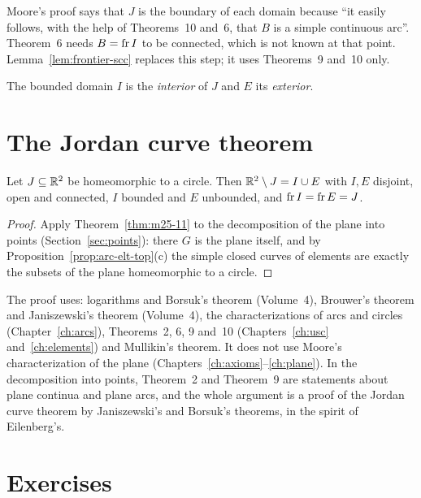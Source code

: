 
\begin{remark}
Moore's proof says that $J$ is the boundary of each domain because ``it easily follows, with the help
of Theorems~10 and~6, that $B$ is a simple continuous arc''. Theorem~6 needs $B=\operatorname{fr} I$ to be
connected, which is not known at that point. Lemma~\ref{lem:frontier-scc} replaces this step; it uses
Theorems~9 and~10 only.
\end{remark}

The bounded domain $I$ is the \emph{interior} of $J$ and $E$ its \emph{exterior}.

\section{The Jordan curve theorem}

\begin{theorem}\label{thm:jct}
Let $J\subseteq\mathbb{R}^2$ be homeomorphic to a circle. Then $\mathbb{R}^2\setminus J=I\cup E$ with $I,E$ disjoint,
open and connected, $I$ bounded and $E$ unbounded, and $\operatorname{fr} I=\operatorname{fr} E=J$.
\end{theorem}

\begin{proof}
Apply Theorem~\ref{thm:m25-11} to the decomposition of the plane into points
(Section~\ref{sec:points}): there $G$ is the plane itself, and by
Proposition~\ref{prop:arc-elt-top}(c) the simple closed curves of elements are exactly the subsets
of the plane homeomorphic to a circle.
\end{proof}


The proof uses: logarithms and Borsuk's theorem (Volume~4), Brouwer's theorem and Janiszewski's
theorem (Volume~4), the characterizations of arcs and circles (Chapter~\ref{ch:arcs}), Theorems~2,
6, 9 and~10 (Chapters~\ref{ch:usc} and~\ref{ch:elements}) and Mullikin's theorem. It does not use
Moore's characterization of the plane (Chapters~\ref{ch:axioms}--\ref{ch:plane}). In the decomposition
into points, Theorem~2 and Theorem~9 are statements about plane continua and plane arcs, and the
whole argument is a proof of the Jordan curve theorem by Janiszewski's and Borsuk's theorems, in the
spirit of Eilenberg's.

\section*{Exercises}

